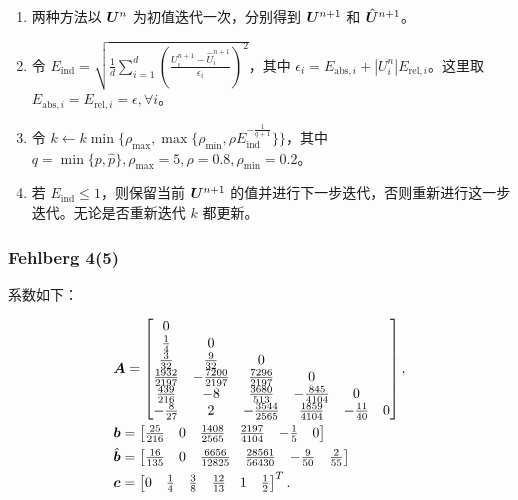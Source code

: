 \documentclass[lang=cn,a4paper,newtx,bibend=bibtex]{elegantpaper}
\begin{document}
\begin{enumerate}
    \item 两种方法以 $\bm{U}^n$ 为初值迭代一次，分别得到 $\bm{U}^{n+1}$ 和 $\hat{\bm{U}}^{n+1}$。
    \item 令 $E_{\mathrm{ind}} = \sqrt{\frac 1d\sum_{i=1}^d(\frac{U_i^{n+1}-\hat{U}_i^{n+1}}{\epsilon_i})^2}$，其中 $\epsilon_i = E_{\mathrm{abs},i}+|U_i^n|E_{\mathrm{rel},i}$。这里取 $E_{\mathrm{abs},i} = E_{\mathrm{rel},i} = \epsilon, \forall i$。
    \item 令 $k\leftarrow k\min\{\rho_{\max}, \max\{\rho_{\min}, \rho E_{\mathrm{ind}}^{-\frac 1{q+1}}\}\}$，其中 $q = \min\{p, \hat{p}\}, \rho_{\max} = 5, \rho = 0.8, \rho_{\min} = 0.2$。
    \item 若 $E_{\mathrm{ind}}\leq 1$，则保留当前 $\bm{U}^{n+1}$ 的值并进行下一步迭代，否则重新进行这一步迭代。无论是否重新迭代 $k$ 都更新。
\end{enumerate}

\subsubsection{Fehlberg 4(5)}

系数如下：

\begin{equation*}
\begin{aligned}
    & \bm{A} = \begin{bmatrix} 
        0 & & & & & \\
        \frac 14 & 0 & & & & \\
        \frac 3{32} & \frac 9{32} & 0 & & & \\
        \frac {1932}{2197} & -\frac {7200}{2197} & \frac{7296}{2197} & 0 & & \\
        \frac {439}{216} & -8 & \frac {3680}{513} & -\frac {845}{4104} & 0 & \\
        -\frac {8}{27} & 2 & -\frac {3544}{2565} & \frac{1859}{4104} & -\frac {11}{40} & 0 \\
     \end{bmatrix},\\
    & \bm{b} = \begin{bmatrix} 
        \frac{25}{216} & 0 & \frac{1408}{2565} & \frac{2197}{4104} & -\frac 15 & 0 \\
     \end{bmatrix}\\
    & \hat{\bm{b}} = \begin{bmatrix} 
        \frac{16}{135} & 0 & \frac{6656}{12825} & \frac{28561}{56430} & -\frac 9{50} & \frac 2{55} \\
     \end{bmatrix}\\
    & \bm{c} = \begin{bmatrix} 0 & \frac 14 & \frac 38 & \frac {12}{13} & 1 & \frac 12 \end{bmatrix}^T.
\end{aligned}
\end{equation*}
\end{document}
